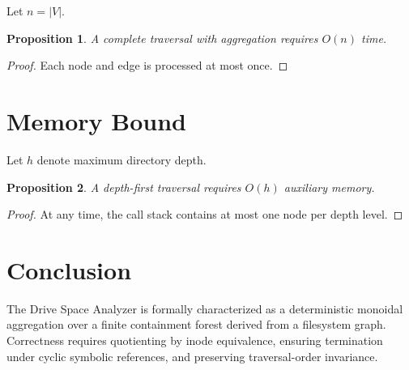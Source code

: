 \documentclass[11pt]{article}
\newtheorem{proposition}{Proposition}
\begin{document}
Let $n = |V|$.

\begin{proposition}
A complete traversal with aggregation requires $O(n)$ time.
\end{proposition}

\begin{proof}
Each node and edge is processed at most once.
\end{proof}

\section{Memory Bound}

Let $h$ denote maximum directory depth.

\begin{proposition}
A depth-first traversal requires $O(h)$ auxiliary memory.
\end{proposition}

\begin{proof}
At any time, the call stack contains at most one node per depth level.
\end{proof}

\section{Conclusion}

The Drive Space Analyzer is formally characterized as a deterministic monoidal aggregation
over a finite containment forest derived from a filesystem graph.
Correctness requires quotienting by inode equivalence, ensuring termination under cyclic symbolic references,
and preserving traversal-order invariance.
\end{document}
